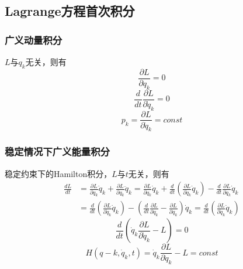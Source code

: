 \documentclass[12pt]{article}
\numberwithin{equation}{section}
\begin{document}
        \subsection{Lagrange方程首次积分}

        \subsubsection{广义动量积分}
        $L$与$q_k$无关，则有
        \begin{equation}
            \frac{\partial L}{\partial q_k}=0
        \end{equation}
        \begin{equation}
            \frac{d}{dt}\frac{\partial L}{\partial \dot{q}_k}=0
        \end{equation}
        \begin{equation}
            p_k=\frac{\partial L}{\partial \dot{q}_k}=const
        \end{equation}

        \subsubsection{稳定情况下广义能量积分}

        稳定约束下的Hamilton积分，$L$与$t$无关，则有
        \begin{equation}
            \begin{aligned}
                \frac{dL}{dt}&=\frac{\partial L}{\partial q_k}\dot{q}_k+\frac{\partial L}{\partial q_k}\ddot{q}_k
                =\frac{\partial L}{\partial q_k}\dot{q}_k+\frac{d}{dt}\left( \frac{\partial L}{\partial \dot{q}_k}\dot{q}_k \right)
                -\frac{d}{dt}\frac{\partial L}{\partial q_k}\dot{q}_k\\
                &=\frac{d}{dt}\left( \frac{\partial L}{\partial \dot{q}_k}\dot{q}_k \right)
                -\left( \frac{d}{dt}\frac{\partial L}{\partial q_k}-\frac{\partial L}{\partial q_k} \right)\dot{q}_k
                =\frac{d}{dt}\left( \frac{\partial L}{\partial \dot{q}_k}\dot{q}_k \right)
            \end{aligned}
        \end{equation}
        \begin{equation}
           \frac{d}{dt}\left( \dot{q}_k\frac{\partial L}{\partial \dot{q}_k}-L \right)=0 
        \end{equation}
        \begin{equation}
           H(q-k,\dot{q}_k,t)=\dot{q}_k\frac{\partial L}{\partial \dot{q}_k}-L=const 
        \end{equation}
\end{document}

